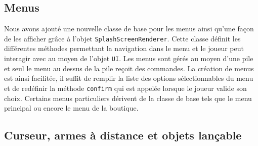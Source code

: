 \documentclass[10pt,a4paper]{article}
\begin{document}
\subsection{Menus}
Nous avons ajouté une nouvelle classe de base pour les menus ainsi qu'une façon de les afficher grâce à l'objet \texttt{SplashScreenRenderer}. Cette classe définit les différentes méthodes permettant la navigation dans le menu et le joueur peut interagir avec au moyen de l'objet \texttt{UI}. Les menus sont gérés au moyen d'une pile et seul le menu au dessus de la pile reçoit des commandes. La création de menus est ainsi facilitée, il suffit de remplir la liste des options sélectionnables du menu et de redéfinir la méthode \texttt{confirm} qui est appelée lorsque le joueur valide son choix.
Certains menus particuliers dérivent de la classe de base tels que le menu principal ou encore le menu de la boutique.

\subsection{Curseur, armes à distance et objets lançable}
\end{document}
